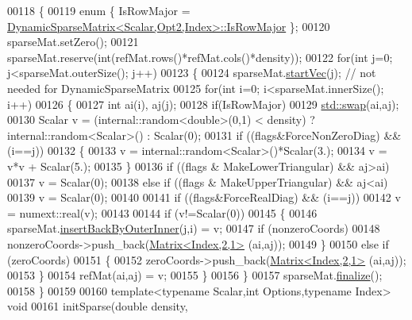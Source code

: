 \begin{DoxyCode}
00118 \{
00119   \textcolor{keyword}{enum} \{ IsRowMajor = \hyperlink{class_eigen_1_1_dynamic_sparse_matrix}{DynamicSparseMatrix<Scalar,Opt2,Index>::IsRowMajor}
       \};
00120   sparseMat.setZero();
00121   sparseMat.reserve(\textcolor{keywordtype}{int}(refMat.rows()*refMat.cols()*density));
00122   \textcolor{keywordflow}{for}(\textcolor{keywordtype}{int} j=0; j<sparseMat.outerSize(); j++)
00123   \{
00124     sparseMat.\hyperlink{class_eigen_1_1_dynamic_sparse_matrix_a294b998a50cc01859425e5e7c23d6108}{startVec}(j); \textcolor{comment}{// not needed for DynamicSparseMatrix}
00125     \textcolor{keywordflow}{for}(\textcolor{keywordtype}{int} i=0; i<sparseMat.innerSize(); i++)
00126     \{
00127       \textcolor{keywordtype}{int} ai(i), aj(j);
00128       \textcolor{keywordflow}{if}(IsRowMajor)
00129         \hyperlink{endian_8c_a3ca5ecd34b04d6a243c054ac3a57f68d}{std::swap}(ai,aj);
00130       Scalar v = (internal::random<double>(0,1) < density) ? internal::random<Scalar>() : Scalar(0);
00131       \textcolor{keywordflow}{if} ((flags&ForceNonZeroDiag) && (i==j))
00132       \{
00133         v = internal::random<Scalar>()*Scalar(3.);
00134         v = v*v + Scalar(5.);
00135       \}
00136       \textcolor{keywordflow}{if} ((flags & MakeLowerTriangular) && aj>ai)
00137         v = Scalar(0);
00138       \textcolor{keywordflow}{else} \textcolor{keywordflow}{if} ((flags & MakeUpperTriangular) && aj<ai)
00139         v = Scalar(0);
00140 
00141       \textcolor{keywordflow}{if} ((flags&ForceRealDiag) && (i==j))
00142         v = numext::real(v);
00143 
00144       \textcolor{keywordflow}{if} (v!=Scalar(0))
00145       \{
00146         sparseMat.\hyperlink{class_eigen_1_1_dynamic_sparse_matrix_ac97c2463058ae55d7f0ef21c851eb5f3}{insertBackByOuterInner}(j,i) = v;
00147         \textcolor{keywordflow}{if} (nonzeroCoords)
00148           nonzeroCoords->push\_back(\hyperlink{group___core___module_class_eigen_1_1_matrix}{Matrix<Index,2,1>} (ai,aj));
00149       \}
00150       \textcolor{keywordflow}{else} \textcolor{keywordflow}{if} (zeroCoords)
00151       \{
00152         zeroCoords->push\_back(\hyperlink{group___core___module_class_eigen_1_1_matrix}{Matrix<Index,2,1>} (ai,aj));
00153       \}
00154       refMat(ai,aj) = v;
00155     \}
00156   \}
00157   sparseMat.\hyperlink{class_eigen_1_1_dynamic_sparse_matrix_aa0abc0e4565143f103f0d7373bd4a125}{finalize}();
00158 \}
00159 
00160 \textcolor{keyword}{template}<\textcolor{keyword}{typename} Scalar,\textcolor{keywordtype}{int} Options,\textcolor{keyword}{typename} Index> \textcolor{keywordtype}{void}
00161 initSparse(\textcolor{keywordtype}{double} density,

\end{DoxyCode}
